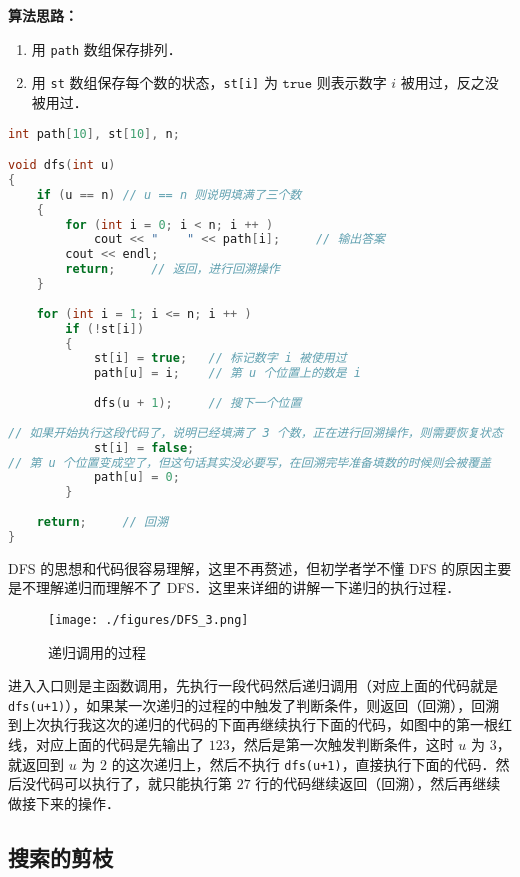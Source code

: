 \textbf{算法思路：}
\begin{enumerate}
\item 用 \verb|path| 数组保存排列．

\item 用 \verb|st| 数组保存每个数的状态，\verb|st[i]| 为 $\mathtt{true}$ 则表示数字 $i$ 被用过，反之没被用过．

\end{enumerate}
\begin{lstlisting}[language=cpp]
int path[10], st[10], n;

void dfs(int u)
{
    if (u == n) // u == n 则说明填满了三个数
    {
        for (int i = 0; i < n; i ++ )
            cout << "    " << path[i];     // 输出答案
        cout << endl;
        return;     // 返回，进行回溯操作
    }
    
    for (int i = 1; i <= n; i ++ )
        if (!st[i])
        {
            st[i] = true;   // 标记数字 i 被使用过
            path[u] = i;    // 第 u 个位置上的数是 i
            
            dfs(u + 1);     // 搜下一个位置
            
// 如果开始执行这段代码了，说明已经填满了 3 个数，正在进行回溯操作，则需要恢复状态
            st[i] = false;  
// 第 u 个位置变成空了，但这句话其实没必要写，在回溯完毕准备填数的时候则会被覆盖
            path[u] = 0;    
        }
        
    return;     // 回溯
}
\end{lstlisting}

DFS 的思想和代码很容易理解，这里不再赘述，但初学者学不懂 DFS 的原因主要是不理解递归而理解不了 DFS．这里来详细的讲解一下递归的执行过程．

\begin{figure}[ht]
\centering
\texttt{[image: ./figures/DFS\_3.png]}
\caption{递归调用的过程} \label{DFS_fig3}
\end{figure}


进入入口则是主函数调用，先执行一段代码然后递归调用（对应上面的代码就是 \verb|dfs(u+1)|），如果某一次递归的过程的中触发了判断条件，则返回（回溯），回溯到上次执行我这次的递归的代码的下面再继续执行下面的代码，如图中的第一根红线，对应上面的代码是先输出了 $1 2 3$，然后是第一次触发判断条件，这时 $u$ 为 $3$，就返回到 $u$ 为 $2$ 的这次递归上，然后不执行 \verb|dfs(u+1)|，直接执行下面的代码．然后没代码可以执行了，就只能执行第 $27$ 行的代码继续返回（回溯），然后再继续做接下来的操作．


\subsection{搜索的剪枝}

